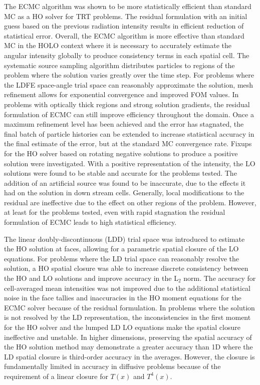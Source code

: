 The ECMC algorithm was shown to be more statistically efficient than standard
MC as a HO solver for TRT problems.  The residual formulation with an initial
guess based on the previous radiation intensity results in efficient reduction
of statistical error.  Overall, the ECMC algorithm is more effective than
standard MC in the HOLO context where it is necessary to accurately estimate
the angular intensity globally to produce consistency terms in each spatial
cell. The systematic source sampling algorithm distributes particles to regions
of the problem where the solution varies greatly over the time step.  For
problems where the LDFE space-angle trial space can reasonably approximate the
solution, mesh refinement allows for exponential convergence and improved FOM
values.   In problems with optically thick regions and strong solution
gradients, the residual formulation of ECMC can still improve efficiency
throughout the domain.  Once a maximum refinement level has been achieved and
the error has stagnated, the final batch of particle histories can be extended
to increase statistical accuracy in the final estimate of the error, but at the
standard MC convergence rate.  Fixups for the HO solver based on rotating
negative solutions to produce a positive solution were investigated.  With a
positive representation of the intensity, the LO solutions were found to be
stable and accurate for the problems tested.  The addition of an artificial
source was found to be inaccurate, due to the effects it had on the solution in
down stream cells.  Generally, local modifications to the residual are
ineffective due to the effect on other regions of the problem. However, at
least for the problems tested, even with rapid stagnation the residual
formulation of ECMC leads to high statistical efficiency.  

The linear doubly-discontinuous (LDD) trial space was introduced to estimate the HO
solution at faces, allowing for a parametric spatial closure of the LO equations. 
For problems where the LD trial space can reasonably resolve the solution, a 
HO spatial closure was able to increase discrete consistency between the HO and LO solutions and improve
accuracy in the L$_2$ norm.  The accuracy for cell-averaged mean intensities was not improved due to the additional statistical noise
in the face tallies and inaccuracies in the HO moment equations for the ECMC solver because of the residual formulation.
In problems where the solution is not resolved by the LD representation, the
inconsistencies in the first moment for the HO solver and the lumped LD LO equations make
the spatial closure ineffective and unstable.
In higher dimensions, preserving the spatial accuracy of the HO solution method may
demonstrate a greater accuracy than 1D where the LD spatial closure is
third-order accuracy in the averages.  However, the closure is fundamentally limited in
accuracy in diffusive problems because of the requirement of a linear closure for $T(x)$ and $T^4(x)$. 

